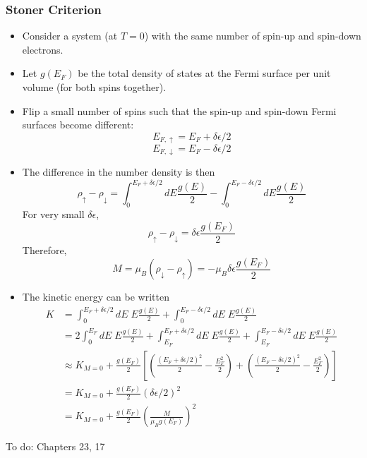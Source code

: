\documentclass[10pt]{article}
\begin{document}
\subsubsection{Stoner Criterion}
\begin{itemize}
\item Consider a system (at $T = 0$) with the same number of spin-up and spin-down electrons.
\item Let $g(E_{F})$ be the total density of states at the Fermi surface per unit volume (for both spins together).
\item Flip a small number of spins such that the spin-up and spin-down Fermi surfaces become different:
$$ E_{F,\uparrow} = E_{F} + \delta\epsilon/2$$
$$ E_{F,\downarrow} = E_{F} - \delta\epsilon/2$$
\item The difference in the number density is then
$$
  \rho_{\uparrow} - \rho_{\downarrow} = \int_{0}^{E_{F} + \delta\epsilon/2} dE \frac{g(E)}{2}  - \int_{0}^{E_{F} - \delta\epsilon/2} dE \frac{g(E)}{2}
$$
For very small $\delta\epsilon$,
$$
\rho_{\uparrow} - \rho_{\downarrow} = \delta \epsilon \frac{g(E_{F})}{2}
$$
Therefore,
$$
  M = \mu_{B}(\rho_{\downarrow} - \rho_{\uparrow}) = -\mu_{B}\delta \epsilon \frac{g(E_{F})}{2}
$$
\item The kinetic energy can be written
\begin{equation}
\begin{aligned}
K & = \int_{0}^{E_{F} + \delta \epsilon/2} dE\; E \frac{g(E)}{2} + \int_{0}^{E_{F} - \delta \epsilon/2} dE \;E \frac{g(E)}{2} \\
& = 2 \int_{0}^{E_{F}} dE \; E\frac{g(E)}{2} + \int_{E_{F}}^{E_{F} + \delta \epsilon/2} dE\; E \frac{g(E)}{2} + \int_{E_{F}}^{E_{F} - \delta \epsilon/2} dE \;E \frac{g(E)}{2} \\
& \approx K_{M=0} + \frac{g(E_{F})}{2}\left [ \left ( \frac{(E_{F} + \delta \epsilon/2)^{2}}{2} - \frac{E_{F}^{2}}{2}\right) + \left ( \frac{(E_{F} - \delta \epsilon/2)^{2}}{2} - \frac{E_{F}^{2}}{2}\right)\right] \\
& = K_{M=0} + \frac{g(E_{F})}{2}(\delta \epsilon/2)^{2} \\
& = K_{M=0} + \frac{g(E_{F})}{2}\left (\frac{M}{\mu_{B}g(E_{F})}\right)^{2}
\end{aligned}
\end{equation}

\end{itemize}
To do: Chapters  23, 17
\end{document}
